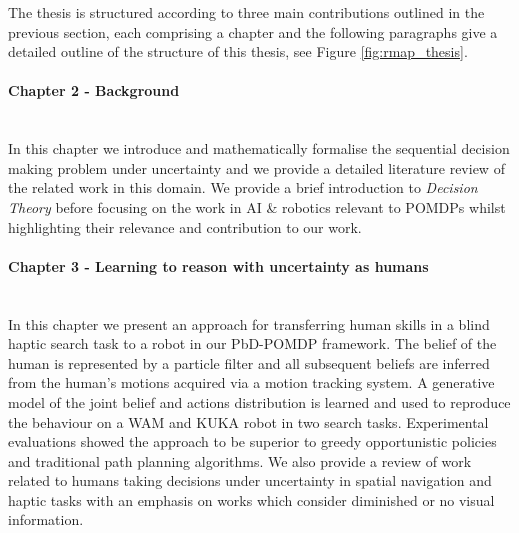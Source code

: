 The thesis is structured according to three main contributions outlined in the previous section, 
each comprising a chapter and the following paragraphs give a detailed outline of the structure 
of this thesis, see Figure \ref{fig:rmap_thesis}.

\begin{minipage}[c]{0.9\textwidth}
\paragraph{Chapter 2 - Background}\\
In this chapter we introduce and mathematically formalise the sequential decision making problem 
under uncertainty and we provide a detailed literature review of the related work in this domain.
We provide a brief introduction to \textit{Decision Theory} before focusing on the work 
in AI \& robotics relevant to POMDPs whilst highlighting their relevance and contribution to our work. 
\end{minipage}

\begin{minipage}[c]{0.9\textwidth}
\paragraph{Chapter 3 - Learning to reason with uncertainty as humans}\\
In this chapter we present an approach for transferring human skills in a blind haptic 
search task to a robot in our PbD-POMDP framework. The belief of the human is represented by a particle filter and 
all subsequent beliefs are inferred from the human's motions acquired via a motion tracking
system. A generative model of the joint belief and actions distribution is learned and used
to reproduce the behaviour on a WAM and KUKA robot in two search tasks. Experimental 
evaluations showed the approach to be superior to greedy opportunistic policies and traditional
path planning algorithms. 
We also provide a review of work related to humans taking decisions under uncertainty 
in spatial navigation and haptic tasks with an emphasis on works which consider diminished or no 
visual information. 
\end{minipage}

